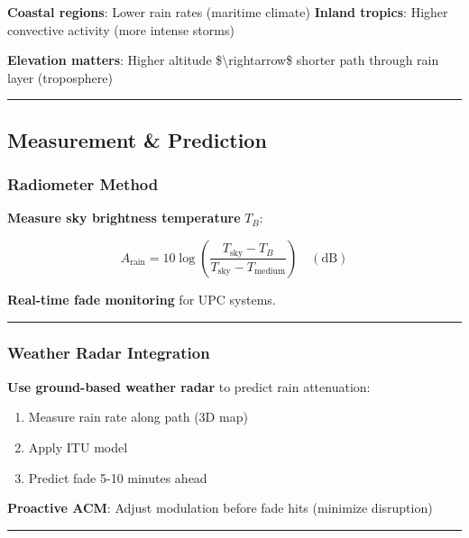 \textbf{Coastal regions}: Lower rain rates (maritime climate)
\textbf{Inland tropics}: Higher convective activity (more intense
storms)

\textbf{Elevation matters}: Higher altitude
\$\textbackslash rightarrow\$ shorter path through rain layer
(troposphere)

\begin{center}\rule{0.5\linewidth}{0.5pt}\end{center}

\subsection{Measurement \& Prediction}\label{measurement-prediction}

\subsubsection{Radiometer Method}\label{radiometer-method}

\textbf{Measure sky brightness temperature} \(T_B\):

\[
A_{\text{rain}} = 10 \log\left(\frac{T_{\text{sky}} - T_B}{T_{\text{sky}} - T_{\text{medium}}}\right) \quad (\text{dB})
\]

\textbf{Real-time fade monitoring} for UPC systems.

\begin{center}\rule{0.5\linewidth}{0.5pt}\end{center}

\subsubsection{Weather Radar
Integration}\label{weather-radar-integration}

\textbf{Use ground-based weather radar} to predict rain attenuation:

\begin{enumerate}
\def\labelenumi{\arabic{enumi}.}
\tightlist
\item
  Measure rain rate along path (3D map)
\item
  Apply ITU model
\item
  Predict fade 5-10 minutes ahead
\end{enumerate}

\textbf{Proactive ACM}: Adjust modulation before fade hits (minimize
disruption)

\begin{center}\rule{0.5\linewidth}{0.5pt}\end{center}

